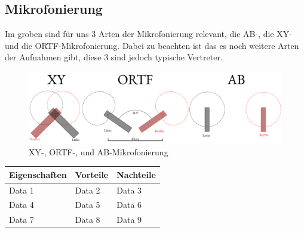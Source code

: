 \subsection{Mikrofonierung}

Im groben sind für uns 3 Arten der Mikrofonierung relevant, die AB-, die XY- und die ORTF-Mikrofonierung. Dabei zu beachten ist das es noch weitere Arten der Aufnahmen gibt, diese 3 sind jedoch typische Vertreter. 

\begin{figure}[h]
    \centering
    \includegraphics[width=1\linewidth]{Bilder/Medientechnik/Mikrofonierung.png}
    \caption{XY-, ORTF-, und AB-Mikrofonierung}
    \label{fig:Mikrofonierung}
\end{figure}
\newpage

\begin{longtable}
{p{}p{}p{}}
 \label{Mikrofonierung} \\
\toprule
Eigenschaften & Vorteile & Nachteile \\
\midrule
Data 1 & Data 2 & Data 3 \\
Data 4 & Data 5 & Data 6 \\
Data 7 & Data 8 & Data 9 \\
\bottomrule
\end{longtable}
